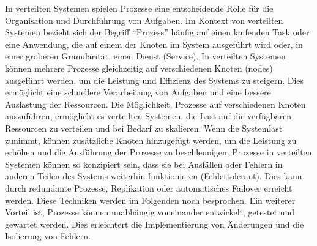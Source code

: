 \documentclass[../vs-script-first-v01.tex]{subfiles}
\begin{document}
In verteilten Systemen spielen Prozesse eine entscheidende Rolle für die Organisation und Durchführung von Aufgaben. Im Kontext von verteilten Systemen bezieht sich der Begriff \enquote{Prozess} häufig auf einen laufenden Task oder eine Anwendung, die auf einem der Knoten im System ausgeführt wird oder, in einer groberen Granularität, einen Dienst (Service). In verteilten Systemen können mehrere Prozesse gleichzeitig auf verschiedenen Knoten (nodes) ausgeführt werden, um die Leistung und Effizienz des Systems zu steigern. Dies ermöglicht eine schnellere Verarbeitung von Aufgaben und eine bessere Auslastung der Ressourcen. 
Die Möglichkeit, Prozesse auf verschiedenen Knoten auszuführen, ermöglicht es verteilten Systemen, die Last auf die verfügbaren Ressourcen zu verteilen und bei Bedarf zu skalieren. Wenn die Systemlast zunimmt, können zusätzliche Knoten hinzugefügt werden, um die Leistung zu erhöhen und die Ausführung der Prozesse zu beschleunigen. Prozesse in verteilten Systemen können so konzipiert sein, dass sie bei Ausfällen oder Fehlern in anderen Teilen des Systems weiterhin funktionieren (Fehlertolerant). Dies kann durch redundante Prozesse, Replikation oder automatisches Failover erreicht werden. Diese Techniken werden im Folgenden noch besprochen. Ein weiterer Vorteil ist, Prozesse können unabhängig voneinander entwickelt, getestet und gewartet werden. Dies erleichtert die Implementierung von Änderungen und die Isolierung von Fehlern. \\\\
\end{document}
